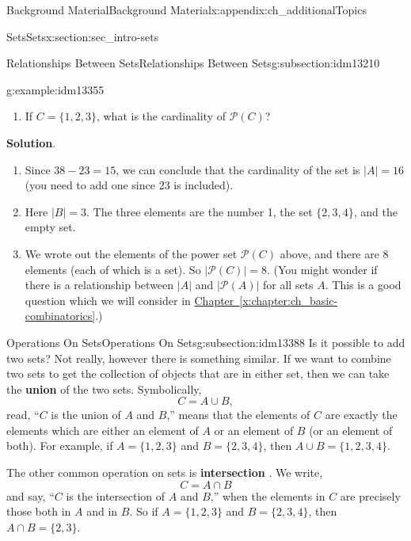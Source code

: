 \documentclass[oneside,10pt,]{book}
\newcommand{\terminology}[1]{\textbf{#1}}
\numberwithin{equation}{chapter}
\def\pow{\mathcal P}
\newcommand{\card}[1]{\left| #1 \right|}
\begin{document}
\begin{appendixptx}{Background Material}{}{Background Material}{}{}{x:appendix:ch_additionalTopics}
\begin{sectionptx}{Sets}{}{Sets}{}{}{x:section:sec_intro-sets}
\begin{subsectionptx}{Relationships Between Sets}{}{Relationships Between Sets}{}{}{g:subsection:idm13210}
\begin{example}{}{g:example:idm13355}
\begin{enumerate}
\item{}If \(C = \{1,2,3\}\), what is the cardinality of \(\pow(C)\)?%
\end{enumerate}
%
\par\smallskip%
\noindent\textbf{Solution}.\hypertarget{g:solution:idm13369}{}\quad{}%
\begin{enumerate}
\item{}Since \(38 - 23 = 15\), we can conclude that the cardinality of the set is \(|A| = 16\) (you need to add one since 23 is included).%
\item{}Here \(|B| = 3\). The three elements are the number 1, the set \(\{2,3,4\}\), and the empty set.%
\item{}We wrote out the elements of the power set \(\pow(C)\) above, and there are 8 elements (each of which is a set). So \(\card{\pow(C)} = 8\).  (You might wonder if there is a relationship between \(\card{A}\) and \(\card{\pow(A)}\) for all sets \(A\).  This is a good question which we will consider in \hyperref[x:chapter:ch_basic-combinatorics]{Chapter~\ref{x:chapter:ch_basic-combinatorics}}.)%
\end{enumerate}
%
\end{example}
\end{subsectionptx}
%
%
\typeout{************************************************}
\typeout{************************************************}
%
\begin{subsectionptx}{Operations On Sets}{}{Operations On Sets}{}{}{g:subsection:idm13388}
Is it possible to add two sets? Not really, however there is something similar. If we want to combine two sets to get the collection of objects that are in either set, then we can take the \terminology{union}  of the two sets. Symbolically,%
\begin{equation*}
C = A \cup B,
\end{equation*}
read, ``\(C\) is the union of \(A\) and \(B\),'' means that the elements of \(C\) are exactly the elements which are either an element of \(A\) or an element of \(B\) (or an element of both). For example, if \(A = \{1, 2, 3\}\) and \(B = \{2, 3, 4\}\), then \(A \cup B = \{1, 2, 3, 4\}\).%
\par
The other common operation on sets is \terminology{intersection} . We write,%
\begin{equation*}
C = A \cap B
\end{equation*}
and say, ``\(C\) is the intersection of \(A\) and \(B\),'' when the elements in \(C\) are precisely those both in \(A\) and in \(B\). So if \(A = \{1, 2, 3\}\) and \(B = \{2, 3, 4\}\), then \(A \cap B = \{2, 3\}\).%

\end{subsectionptx}
\end{sectionptx}
\end{appendixptx}
\end{document}
